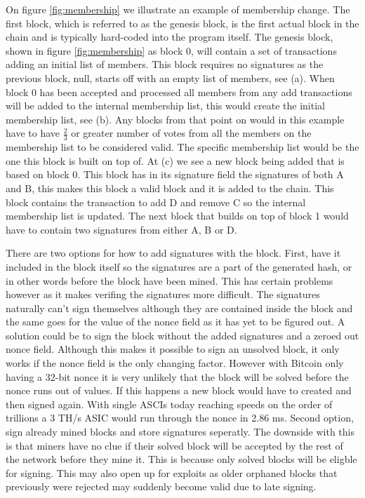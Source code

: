 \documentclass[12pt]{article}
\begin{document}
On figure \ref{fig:membership} we illustrate an example of membership change. The first block, which is referred to as the genesis block, is the first actual block in the chain and is typically hard-coded into the program itself. The genesis block, shown in figure \ref{fig:membership} as block 0, will contain a set of transactions adding an initial list of members. This block requires no signatures as the previous block, null, starts off with an empty list of members, see (a). When block 0 has been accepted and processed all members from any add transactions will be added to the internal membership list, this would create the initial membership list, see (b). Any blocks from that point on would in this example have to have $\frac{2}{3}$ or greater number of votes from all the members on the membership list to be considered valid. The specific membership list would be the one this block is built on top of. At (c) we see a new block being added that is based on block 0. This block has in its signature field the signatures of both A and B, this makes this block a valid block and it is added to the chain. This block contains the transaction to add D and remove C so the internal membership list is updated. The next block that builds on top of block 1 would have to contain two signatures from either A, B or D.


There are two options for how to add signatures with the block. First, have it included in the block itself so the signatures are a part of the generated hash, or in other words before the block have been mined. This has certain problems however as it makes verifing the signatures more difficult. The signatures naturally can't sign themselves although they are contained inside the block and the same goes for the value of the nonce field as it has yet to be figured out. A solution could be to sign the block without the added signatures and a zeroed out nonce field. Although this makes it possible to sign an unsolved block, it only works if the nonce field is the only changing factor. However with Bitcoin only having a 32-bit nonce it is very unlikely that the block will be solved before the nonce runs out of values. If this happens a new block would have to created and then signed again. With single ASCIs today reaching speeds on the order of trillions a 3 TH/s ASIC would run through the nonce in 2.86 ms. Second option, sign already mined blocks and store signatures seperatly. The downside with this is that miners have no clue if their solved block will be accepted by the rest of the network before they mine it. This is because only solved blocks will be eligble for signing. This may also open up for exploits as older orphaned blocks that previously were rejected may suddenly become valid due to late signing.
\end{document}
